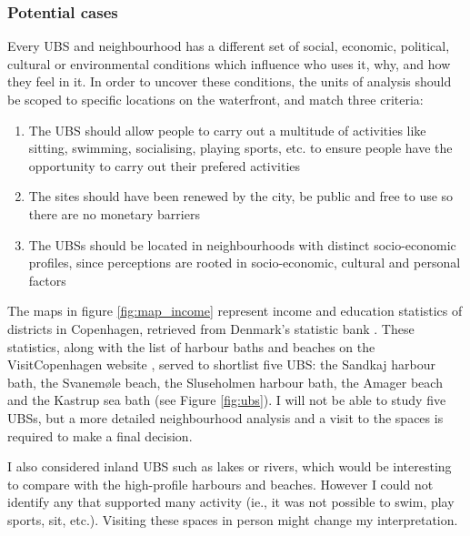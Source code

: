 \documentclass{article}
\begin{document}

\subsubsection{Potential cases}

Every UBS and neighbourhood has a different set of social, economic, political, cultural or environmental conditions which influence who uses it, why, and how they feel in it. In order to uncover these conditions, the units of analysis should be scoped to specific locations on the waterfront, and match three criteria:

\begin{enumerate}
	\item The UBS should allow people to carry out a multitude of activities like sitting, swimming, socialising, playing sports, etc. to ensure people have the opportunity to carry out their prefered activities
	\item The sites should have been renewed by the city, be public and free to use so there are no monetary barriers
	\item The UBSs should be located in neighbourhoods with distinct socio-economic profiles, since perceptions are rooted in socio-economic, cultural and personal factors
\end{enumerate}

The maps in figure \ref{fig:map_income} represent income and education statistics of districts in Copenhagen, retrieved from Denmark's statistic bank \parencite{copenhagenStatbank}. These statistics, along with the list of harbour baths and beaches on the VisitCopenhagen website \parencite{visitcopenhagen_baths}, served to shortlist five UBS: the Sandkaj harbour bath, the Svanemøle beach, the Sluseholmen harbour bath, the Amager beach and the Kastrup sea bath (see Figure \ref{fig:ubs}). I will not be able to study five UBSs, but a more detailed neighbourhood analysis and a visit to the spaces is required to make a final decision. 

I also considered inland UBS such as lakes or rivers, which would be interesting to compare with the high-profile harbours and beaches. However I could not identify any that supported many activity (ie., it was not possible to swim, play sports, sit, etc.). Visiting these spaces in person might change my interpretation.
\end{document}
